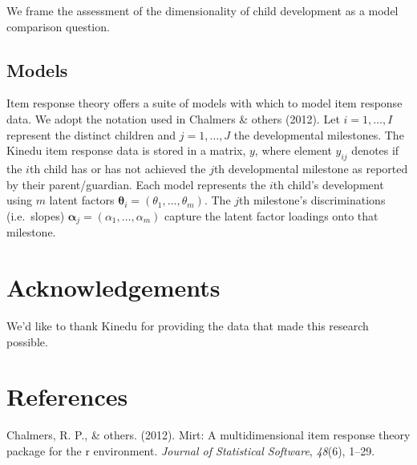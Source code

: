 \documentclass[10pt, letterpaper]{article}
\begin{document}
We frame the assessment of the dimensionality of child development as a
model comparison question.

\hypertarget{models}{%
\subsection{Models}\label{models}}

Item response theory offers a suite of models with which to model item
response data. We adopt the notation used in Chalmers \& others (2012).
Let \(i = 1, \ldots, I\) represent the distinct children and
\(j = 1, \ldots, J\) the developmental milestones. The Kinedu item
response data is stored in a matrix, \(y\), where element \(y_{ij}\)
denotes if the \(i\)th child has or has not achieved the \(j\)th
developmental milestone as reported by their parent/guardian. Each model
represents the \(i\)th child's development using \(m\) latent factors
\(\boldsymbol{\theta}_{i}=(\theta_1, \ldots, \theta_m)\). The \(j\)th
milestone's discriminations (i.e.~slopes)
\(\boldsymbol{\alpha}_{j}=(\alpha_{1}, \dots, \alpha_{m})\) capture the
latent factor loadings onto that milestone.

\hypertarget{acknowledgements}{%
\section{Acknowledgements}\label{acknowledgements}}

We'd like to thank Kinedu for providing the data that made this research
possible.

\hypertarget{references}{%
\section{References}\label{references}}

\setlength{\parindent}{-0.1in} 
\setlength{\leftskip}{0.125in}

\noindent

\hypertarget{refs}{}
\leavevmode\hypertarget{ref-chalmers2012mirt}{}%
Chalmers, R. P., \& others. (2012). Mirt: A multidimensional item
response theory package for the r environment. \emph{Journal of
Statistical Software}, \emph{48}(6), 1--29.


\end{document}
